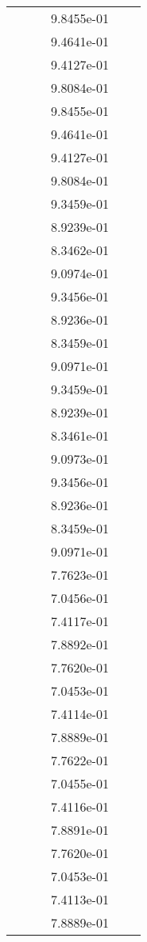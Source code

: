 \begin{xltabular}{\textwidth}{r|rS[table-format=1.3e+2]S[table-format=1.4e+2]S[table-format=1.4e+2]S[table-format=-1.5]}
&  &  & 9.8455e-01 & & \\
&  &  & 9.4641e-01 & & \\
&  &  & 9.4127e-01 & & \\
&  &  & 9.8084e-01 & & \\
&  &  & 9.8455e-01 & & \\
&  &  & 9.4641e-01 & & \\
&  &  & 9.4127e-01 & & \\
&  &  & 9.8084e-01 & & \\
&  &  & 9.3459e-01 & & \\
&  &  & 8.9239e-01 & & \\
&  &  & 8.3462e-01 & & \\
&  &  & 9.0974e-01 & & \\
&  &  & 9.3456e-01 & & \\
&  &  & 8.9236e-01 & & \\
&  &  & 8.3459e-01 & & \\
&  &  & 9.0971e-01 & & \\
&  &  & 9.3459e-01 & & \\
&  &  & 8.9239e-01 & & \\
&  &  & 8.3461e-01 & & \\
&  &  & 9.0973e-01 & & \\
&  &  & 9.3456e-01 & & \\
&  &  & 8.9236e-01 & & \\
&  &  & 8.3459e-01 & & \\
&  &  & 9.0971e-01 & & \\
&  &  & 7.7623e-01 & & \\
&  &  & 7.0456e-01 & & \\
&  &  & 7.4117e-01 & & \\
&  &  & 7.8892e-01 & & \\
&  &  & 7.7620e-01 & & \\
&  &  & 7.0453e-01 & & \\
&  &  & 7.4114e-01 & & \\
&  &  & 7.8889e-01 & & \\
&  &  & 7.7622e-01 & & \\
&  &  & 7.0455e-01 & & \\
&  &  & 7.4116e-01 & & \\
&  &  & 7.8891e-01 & & \\
&  &  & 7.7620e-01 & & \\
&  &  & 7.0453e-01 & & \\
&  &  & 7.4113e-01 & & \\
&  &  & 7.8889e-01 & & \\

\end{xltabular}
